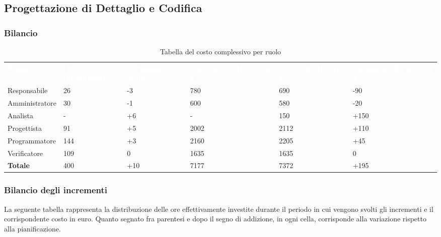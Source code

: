 \subsection{Progettazione di Dettaglio e Codifica}
\subsubsection{Bilancio}

{
\renewcommand{\arraystretch}{2}
\begin{longtable}[h]{ C{2.5cm} C{2cm} C{2cm} C{2.5cm} C{1.5cm} C{2.5cm}}
\caption{Tabella del costo complessivo per ruolo}\\

\textcolor{white}{\textbf{Ruolo}} & 
\textcolor{white}{\textbf{Ore preventivate}} & 
\textcolor{white}{\textbf{Variazione oraria}} & 
\textcolor{white}{\textbf{Costo preventivato (in \euro{})}} & 
\textcolor{white}{\textbf{Costo effettivo (in \euro{})}} & 
\textcolor{white}{\textbf{Variazione di costo (in \euro{})}}\\	
	
Responsabile    &  26 &  -3 &  780 &  690 &  -90 \\
Amministratore  &  30 &  -1 &  600 &  580 &  -20 \\
Analista        &   - &  +6 &    - &  150 & +150 \\
Progettista     &  91 &  +5 & 2002 & 2112 & +110 \\
Programmatore   & 144 &  +3 & 2160 & 2205 &  +45 \\
Verificatore    & 109 &   0 & 1635 & 1635 &    0 \\
\textbf{Totale} & 400 & +10 & 7177 & 7372 & +195 \\	

\end{longtable}
}

\subsubsection{Bilancio degli incrementi}
La seguente tabella rappresenta la distribuzione delle ore effettivamente investite durante il periodo in cui vengono svolti gli incrementi e il corrispondente costo in euro.
Quanto segnato fra parentesi e dopo il segno di addizione, in ogni cella, corrisponde alla variazione rispetto alla pianificazione.

